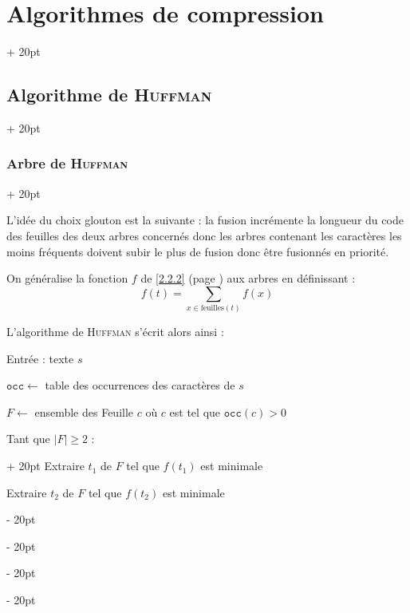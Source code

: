 \documentclass[a4paper, 12pt, twoside]{article}
\newcommand{\abs}[1]{\left\lvert #1 \right\rvert}
\renewcommand{\ge}{\geqslant}
\newcommand{\ind}[1][20pt]{\advance\leftskip + #1}
\newcommand{\deind}[1][20pt]{\advance\leftskip - #1}
\newenvironment{indt}[2][20pt]{#2 \par \ind[#1]}{\par \deind} %
\begin{document}
\begin{indt}{\section{Algorithmes de compression}}
\begin{indt}{\subsection{Algorithme de \textsc{Huffman}}}
\begin{indt}{\subsubsection{Arbre de \textsc{Huffman}}}
\begin{center}
                \end{center}

                L'idée du choix glouton est la suivante : la fusion incrémente la longueur du code des feuilles des deux arbres concernés donc les arbres contenant les caractères les moins fréquents doivent subir le plus de fusion donc être fusionnés en priorité.

                On généralise la fonction $f$ de \ref{2.2.2} (page \pageref{2.2.2}) aux arbres en définissant :
                \[
                    f(t) = \sum_{x \in \mathrm{feuilles}(t)} f(x)
                \]

                L'algorithme de \textsc{Huffman} s'écrit alors ainsi :

                Entrée : texte $s$

                \begin{pseudocode}
                    $\mathtt{occ} \leftarrow$ table des occurrences des caractères de $s$

                    $F \leftarrow$ ensemble des Feuille $c$ où $c$ est tel que $\mathtt{occ}(c) > 0$

                    \vspace{6pt}
                    
                    \begin{indt}{Tant que $\abs F \ge 2$ :}
                        Extraire $t_1$ de $F$ tel que $f(t_1)$ est minimale

                        Extraire $t_2$ de $F$ tel que $f(t_2)$ est minimale


\end{indt}
\end{pseudocode}
\end{indt}
\end{indt}
\end{indt}
\end{document}
